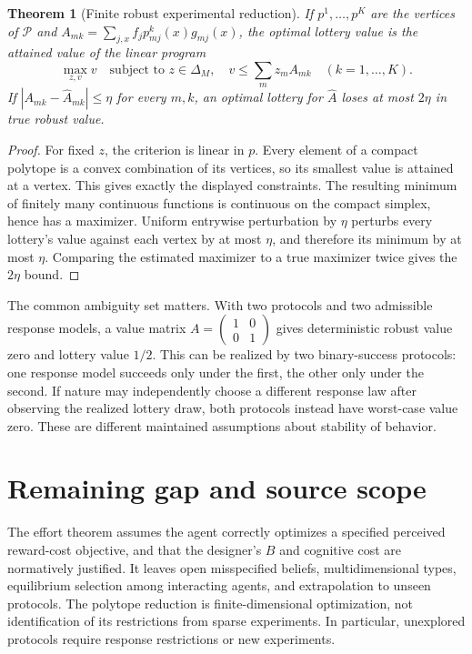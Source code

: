 \documentclass[11pt]{article}
\newtheorem{theorem}{Theorem}
\theoremstyle{remark}\newtheorem{remark}[theorem]{Remark}
\begin{document}
\begin{theorem}[Finite robust experimental reduction]
If $p^1,\ldots,p^K$ are the vertices of $\mathcal P$ and
$A_{mk}=\sum_{j,x}f_jp^k_{mj}(x)g_{mj}(x)$, the optimal lottery value is the attained value of the linear program
\[
 \max_{z,v}v\quad\text{subject to }z\in\Delta_M,
 \quad v\le\sum_m z_m A_{mk}\quad(k=1,\ldots,K).
\]
If $|A_{mk}-\widehat A_{mk}|\le\eta$ for every $m,k$, an optimal lottery for $\widehat A$ loses at most $2\eta$ in true robust value.
\end{theorem}
\begin{proof}
For fixed $z$, the criterion is linear in $p$. Every element of a compact polytope is a convex combination of its vertices, so its smallest value is attained at a vertex. This gives exactly the displayed constraints. The resulting minimum of finitely many continuous functions is continuous on the compact simplex, hence has a maximizer. Uniform entrywise perturbation by $\eta$ perturbs every lottery's value against each vertex by at most $\eta$, and therefore its minimum by at most $\eta$. Comparing the estimated maximizer to a true maximizer twice gives the $2\eta$ bound.
\end{proof}

The common ambiguity set matters. With two protocols and two admissible response models, a value matrix $A=\left(\begin{smallmatrix}1&0\\0&1\end{smallmatrix}\right)$ gives deterministic robust value zero and lottery value $1/2$. This can be realized by two binary-success protocols: one response model succeeds only under the first, the other only under the second. If nature may independently choose a different response law after observing the realized lottery draw, both protocols instead have worst-case value zero. These are different maintained assumptions about stability of behavior.

\section*{Remaining gap and source scope}
The effort theorem assumes the agent correctly optimizes a specified perceived reward-cost objective, and that the designer's $B$ and cognitive cost are normatively justified. It leaves open misspecified beliefs, multidimensional types, equilibrium selection among interacting agents, and extrapolation to unseen protocols. The polytope reduction is finite-dimensional optimization, not identification of its restrictions from sparse experiments. In particular, unexplored protocols require response restrictions or new experiments.
\end{document}
